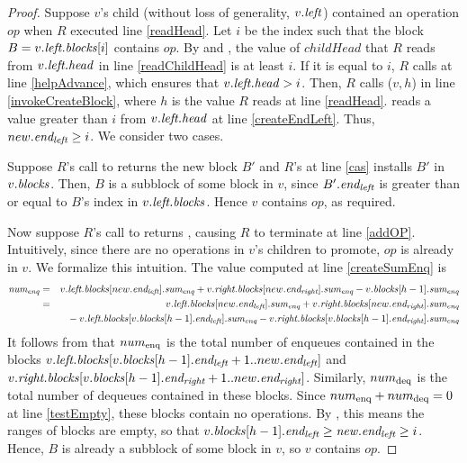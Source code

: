 \begin{proof}
Suppose $v$'s child (without loss of generality, $v.\mbox{\textit{left}}$) contained an operation $op$ 
when $R$ executed line \ref{readHead}.
Let $i$ be the index such that the block $B=v.\mbox{\textit{left.blocks}}[i]$ contains $op$.
By  and , the value of $childHead$ that $R$ reads from
$v.\mbox{\textit{left.head}}$ in line \ref{readChildHead} is at least $i$.
If it is equal to $i$, $R$ calls  at line \ref{helpAdvance}, which ensures that 
$v.\mbox{\textit{left.head}} > i$.
Then, $R$ calls ($v,h$) in line \ref{invokeCreateBlock}, where $h$ is the value $R$ reads at line \ref{readHead}.
 reads a value greater than $i$ from $v.\mbox{\textit{left.head}}$ at line \ref{createEndLeft}.
Thus, $new.\mbox{\textit{end\textsubscript{left}}} \geq i$.  We consider two cases.

Suppose $R$'s call to  returns the new block $B'$ and $R$'s  at line \ref{cas} 
installs $B'$ in $v.\mbox{\textit{blocks}}$.
Then, $B$ is a subblock of some block in $v$, since  $B'.\mbox{\textit{end\textsubscript{left}}}$ is greater than or equal to $B$'s index
in $v.\mbox{\textit{left.blocks}}$.
Hence $v$ contains $op$, as required.

Now suppose $R$'s call to  returns \nl, causing $R$ to terminate at line \ref{addOP}.
Intuitively, since there are no operations in $v$'s children to promote, $op$ is already in $v$.
We formalize this intuition.
The value computed at line \ref{createSumEnq} is
\begin{eqnarray*}
\mbox{\textnormal{\textit{num\textsubscript{enq}}}} 
&=& v.\mbox{\textit{left.blocks}}[new.\mbox{\textit{end\textsubscript{left}}}].\mbox{\textit{sum\textsubscript{enq}}} + v.\mbox{\textit{right.blocks}}[new.\mbox{\textit{end\textsubscript{right}}}].\mbox{\textit{sum\textsubscript{enq}}} - v.\mbox{\textit{blocks}}[h-1].\mbox{\textit{sum\textsubscript{enq}}} \\
&=& v.\mbox{\textit{left.blocks}}[new.\mbox{\textit{end\textsubscript{left}}}].\mbox{\textit{sum\textsubscript{enq}}} + v.\mbox{\textit{right.blocks}}[new.\mbox{\textit{end\textsubscript{right}}}].\mbox{\textit{sum\textsubscript{enq}}} \\
&&\mbox{ }- v.\mbox{\textit{left.blocks}}[v.\mbox{\textit{blocks}}[h-1].\mbox{\textit{end\textsubscript{left}}}].\mbox{\textit{sum\textsubscript{enq}}} - v.\mbox{\textit{right.blocks}}[v.\mbox{\textit{blocks}}[h-1].\mbox{\textit{end\textsubscript{right}}}].\mbox{\textit{sum\textsubscript{enq}}}
\end{eqnarray*}
It follows from  that $num\textsubscript{enq}$ is the total number of enqueues contained in the blocks
$v.\mbox{\textit{left.blocks}}[v.\mbox{\textit{blocks}}[h-1].\mbox{\textit{end\textsubscript{left}}}+1..new.\mbox{\textit{end\textsubscript{left}}}]$ and
$v.\mbox{\textit{right.blocks}}[v.\mbox{\textit{blocks}}[h-1].\mbox{\textit{end\textsubscript{right}}}+1..new.\mbox{\textit{end\textsubscript{right}}}]$.
Similarly, $num\textsubscript{deq}$ is the total number of dequeues contained in these blocks.
Since $num\textsubscript{enq}+num\textsubscript{deq}=0$ at line \ref{testEmpty},
these blocks contain no operations.
By , this means the ranges of blocks are empty, so that $v.\mbox{\textit{blocks}}[h-1].\mbox{\textit{end\textsubscript{left}}} \geq \mbox{\textnormal{\textit{new}}}.\mbox{\textit{end\textsubscript{left}}} \geq i$.
Hence, $B$ is already a subblock of some block in $v$, so $v$ contains $op$.
\end{proof}

